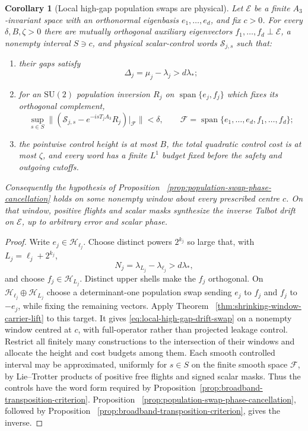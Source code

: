 \documentclass[11pt]{article}
\newtheorem{corollary}[theorem]{Corollary}
\theoremstyle{remark}
\begin{document}
\begin{corollary}[Local high-gap population swaps are physical]
\label{cor:local-high-gap-physical-swaps}
Let $\mathcal E$ be a finite $A_3$-invariant space with an orthonormal
eigenbasis $e_1,\ldots,e_d$, and fix $c>0$.  For every
$\delta,B,\zeta>0$ there are mutually orthogonal auxiliary eigenvectors
$f_1,\ldots,f_d\perp\mathcal E$, a nonempty interval
$S\ni c$, and physical scalar-control words $\mathcal S_{j,s}$ such that:
\begin{enumerate}
\item their gaps satisfy
\[
 \Delta_j=\mu_j-\lambda_j>d\lambda_\ast;
\]
\item for an $\mathrm{SU}(2)$ population inversion $R_j$ on
$\operatorname{span}\{e_j,f_j\}$ which fixes its orthogonal complement,
\begin{equation}
 \sup_{s\in S}
 \|(\mathcal S_{j,s}-e^{-isT_jA_3}R_j)|_{\mathcal F}\|<\delta,
 \qquad
 \mathcal F=\operatorname{span}\{e_1,\ldots,e_d,f_1,\ldots,f_d\};
 \label{eq:local-high-gap-drift-swap}
 \end{equation}
\item the pointwise control height is at most $B$, the total quadratic
control cost is at most $\zeta$, and every word has a finite $L^1$ budget
fixed before the safety and outgoing cutoffs.
\end{enumerate}
Consequently the hypothesis of Proposition
~\ref{prop:population-swap-phase-cancellation} holds on some nonempty
window about every prescribed centre $c$.  On that window, positive flights
and scalar masks synthesize the inverse Talbot drift on $\mathcal E$, up to
arbitrary error and scalar phase.
\end{corollary}

\begin{proof}
Write $e_j\in\mathcal H_{\ell_j}$.  Choose distinct powers $2^{k_j}$ so
large that, with $L_j=\ell_j+2^{k_j}$,
\[
 N_j=\lambda_{L_j}-\lambda_{\ell_j}>d\lambda_\ast,
\]
and choose $f_j\in\mathcal H_{L_j}$.  Distinct upper shells make the
$f_j$ orthogonal.  On
$\mathcal H_{\ell_j}\oplus\mathcal H_{L_j}$ choose a determinant-one
population swap sending $e_j$ to $f_j$ and $f_j$ to $-e_j$, while fixing
the remaining vectors.  Apply Theorem
~\ref{thm:shrinking-window-carrier-lift} to this target.  It gives
\eqref{eq:local-high-gap-drift-swap} on a nonempty window centred at $c$,
with full-operator rather than projected leakage control.  Restrict all
finitely many constructions to the intersection of their windows and
allocate the height and cost budgets among them.  Each smooth controlled
interval may be approximated, uniformly for $s\in S$ on the finite smooth
space $\mathcal F$, by Lie--Trotter products of positive free flights and
signed scalar masks.  Thus the controls have the word form required by
Proposition~\ref{prop:broadband-transposition-criterion}.  Proposition
~\ref{prop:population-swap-phase-cancellation}, followed by Proposition
~\ref{prop:broadband-transposition-criterion}, gives the inverse.
\end{proof}
\end{document}
